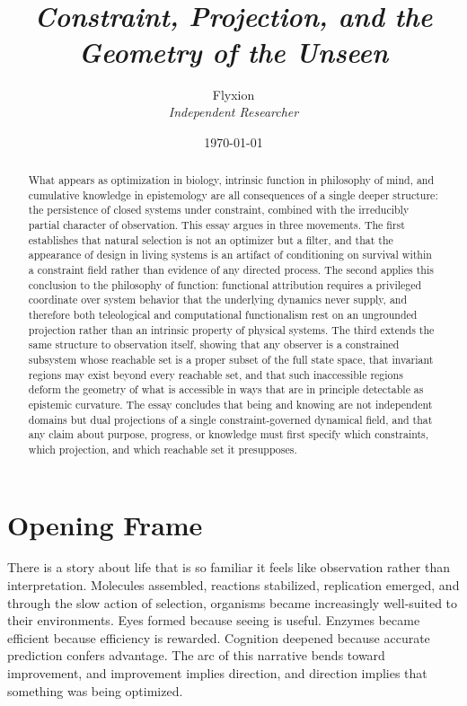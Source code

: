 \documentclass[12pt, a4paper, oneside]{article}
\title{\vspace{-1cm}{\Large\scshape Selection Without Design}\\[0.5em]
{\normalsize\itshape Constraint, Projection, and the Geometry of the Unseen}}
\author{Flyxion\\[0.3em]
\small\itshape Independent Researcher}
\date{\today}
\theoremstyle{plain}
\theoremstyle{definition}
\theoremstyle{remark}
\begin{document}
\maketitle
\thispagestyle{fancy}

\begin{abstract}
What appears as optimization in biology, intrinsic function in philosophy of mind, and cumulative knowledge in epistemology are all consequences of a single deeper structure: the persistence of closed systems under constraint, combined with the irreducibly partial character of observation. This essay argues in three movements. The first establishes that natural selection is not an optimizer but a filter, and that the appearance of design in living systems is an artifact of conditioning on survival within a constraint field rather than evidence of any directed process. The second applies this conclusion to the philosophy of function: functional attribution requires a privileged coordinate over system behavior that the underlying dynamics never supply, and therefore both teleological and computational functionalism rest on an ungrounded projection rather than an intrinsic property of physical systems. The third extends the same structure to observation itself, showing that any observer is a constrained subsystem whose reachable set is a proper subset of the full state space, that invariant regions may exist beyond every reachable set, and that such inaccessible regions deform the geometry of what is accessible in ways that are in principle detectable as epistemic curvature. The essay concludes that being and knowing are not independent domains but dual projections of a single constraint-governed dynamical field, and that any claim about purpose, progress, or knowledge must first specify which constraints, which projection, and which reachable set it presupposes.
\end{abstract}

\vspace{1em}
\tableofcontents
\newpage

\section*{Opening Frame}

There is a story about life that is so familiar it feels like observation rather than interpretation. Molecules assembled, reactions stabilized, replication emerged, and through the slow action of selection, organisms became increasingly well-suited to their environments. Eyes formed because seeing is useful. Enzymes became efficient because efficiency is rewarded. Cognition deepened because accurate prediction confers advantage. The arc of this narrative bends toward improvement, and improvement implies direction, and direction implies that something was being optimized.
\end{document}
